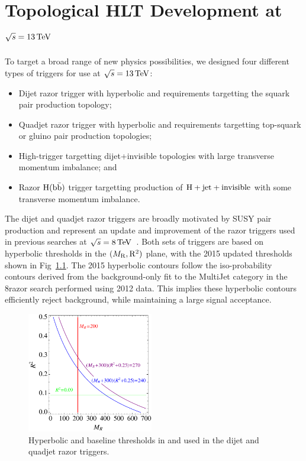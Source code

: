 \chapter{Topological HLT Development at $\sqrt{s}=13 \,\text{Te\hspace{-.08em}V}$}
\label{ch:hlt13TeV}

To target a broad range of new physics possibilities, we designed four different
types of triggers for use at $\sqrt{s}=13\,\text{Te\hspace{-.08em}V}$:
\begin{itemize}
\item Dijet razor trigger with hyperbolic \MR and \Rtwo requirements targetting the squark pair production topology;
\item Quadjet razor trigger with hyperbolic \MR and \Rtwo requirements
  targetting top-squark or gluino pair production topologies;
\item High-\Rtwo trigger targetting dijet+invisible topologies with
  large transverse momentum imbalance; and
\item Razor $\mathrm{H}(\mathrm{b}\bar{\mathrm{b}})$ trigger targetting production of
  $\mathrm{H}+\mathrm{jet}+\mathrm{invisible}$ with some transverse momentum imbalance.
\end{itemize}

The dijet and quadjet razor triggers are broadly motivated by SUSY pair
production and represent an update and improvement of the razor triggers
used in previous searches at $\sqrt{s}=8\,\text{Te\hspace{-.08em}V}$~\cite{razor8TeV}. Both
sets of triggers are based on hyperbolic thresholds in the $(M_\mathrm{R},\mathrm{R}^2)$
plane, with the 2015 updated thresholds shown in
Fig~\ref{fig:hyperbolic}. The 2015 hyperbolic contours follow the
iso-probability contours derived from the background-only fit to the MultiJet category
in the 8\TeV razor search performed using 2012 data. This implies
these hyperbolic contours efficiently reject background, while
maintaining a large signal acceptance. 

\begin{figure}[ht!]
\centering
\includegraphics[width=0.49\textwidth]{figs/hlt13TeV/HLTRsqMR.pdf}
\caption{\label{fig:hyperbolic} Hyperbolic and baseline thresholds in
  \Rtwo and \MR used in the dijet and quadjet razor triggers.}
\end{figure}

